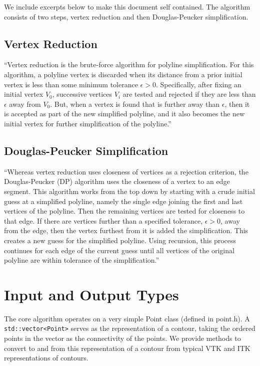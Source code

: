 \documentclass{InsightArticle}
\begin{document}
We include excerpts below to make this document self contained. The algorithm consists of two steps, vertex reduction and then Douglas-Peucker simplification.

\subsection{Vertex Reduction}
``Vertex reduction is the brute-force algorithm for polyline simplification.  For this algorithm, a polyline vertex is discarded when its distance from a prior initial vertex is less than some minimum tolerance $\epsilon > 0$.   Specifically,  after fixing an initial vertex $V_0$, successive vertices $V_i$ are tested and rejected if they are less than $\epsilon$ away from $V_0$. But, when a vertex is found that is further away than $\epsilon$, then it is accepted as part of the new simplified polyline, and it also becomes the new initial vertex for further simplification of the polyline.''

\subsection{Douglas-Peucker Simplification}
``Whereas vertex reduction uses closeness of vertices as a rejection criterion, the Douglas-Peucker (DP) algorithm uses the closeness of a vertex to an edge segment.  This algorithm works from the top down by starting with a crude initial guess at a simplified polyline, namely the single edge joining the first and last vertices of the polyline.   Then the remaining vertices are tested for closeness to that edge.  If there are vertices further than a specified tolerance, $\epsilon > 0$, away from the edge, then the vertex furthest from it is added the simplification.  This creates a new guess for the simplified polyline.  Using recursion, this process continues for each edge of the current guess until all vertices of the original polyline are within tolerance of the simplification.''

\section{Input and Output Types}
The core algorithm operates on a very simple Point class (defined in point.h). A \verb|std::vector<Point>| serves as the representation of a contour, taking the ordered points in the vector as the connectivity of the points. We provide methods to convert to and from this representation of a contour from typical VTK and ITK representations of contours.
\end{document}
